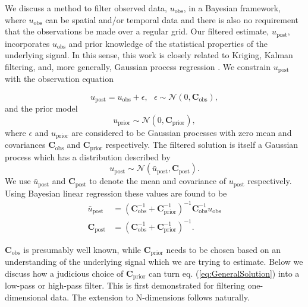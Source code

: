 \documentclass[10pt,a4paper]{article}
\begin{document}
We discuss a method to filter observed data, $u_\mathrm{obs}$, in a Bayesian framework, where $u_\mathrm{obs}$ can be spatial and/or temporal data and there is also no requirement that the observations be made over a regular grid. Our filtered estimate, $u_\mathrm{post}$, incorporates $u_\mathrm{obs}$ and prior knowledge of the statistical properties of the underlying signal.  In this sense, this work is closely related to Kriging, Kalman filtering, and, more generally, Gaussian process regression \citep[e.g][]{Rasmussen2006} .  We constrain $u_\mathrm{post}$ with the observation equation

\begin{equation}\label{eq:Data}
  u_\mathrm{post} = u_\mathrm{obs} + \epsilon,\ \ \ \epsilon \sim \mathcal{N}(0,\mathbf{C}_\mathrm{obs}),
\end{equation}
and the prior model
\begin{equation}\label{eq:Prior}
  u_\mathrm{prior} \sim \mathcal{N}(0,\mathbf{C}_\mathrm{prior}),
\end{equation}
where $\epsilon$ and $u_\mathrm{prior}$ are considered to be Gaussian processes with zero mean and covariances $\mathbf{C}_\mathrm{obs}$ and $\mathbf{C}_\mathrm{prior}$ respectively.  The filtered solution is itself a Gaussian process which has a distribution described by
\begin{equation}
  u_\mathrm{post} \sim \mathcal{N}(\bar{u}_\mathrm{post},\mathbf{C}_\mathrm{post}).
\end{equation}
We use $\bar{u}_\mathrm{post}$ and $\mathbf{C}_\mathrm{post}$ to denote the mean and covariance of $u_\mathrm{post}$ respectively.  Using Bayesian linear regression \citep[e.g.][]{Tarantola2005} these values are found to be  
\begin{equation}\label{eq:GeneralSolution}
\begin{split}
  \bar{u}_\mathrm{post} &= (\mathbf{C}_\mathrm{obs}^{-1} + 
                            \mathbf{C}_\mathrm{prior}^{-1})^{-1}
                            \mathbf{C}_\mathrm{obs}^{-1} u_\mathrm{obs}
\\
\mathbf{C}_\mathrm{post} &= (\mathbf{C}_\mathrm{obs}^{-1} + 
                             \mathbf{C}_\mathrm{prior}^{-1})^{-1}.                          
\end{split}
\end{equation}
 
$\mathbf{C}_\mathrm{obs}$ is presumably well known, while $\mathbf{C}_\mathrm{prior}$ needs to be chosen based on an understanding of the underlying signal which we are trying to estimate.  Below we discuss how a judicious choice of $\mathbf{C}_\mathrm{prior}$ can turn eq. (\ref{eq:GeneralSolution}) into a low-pass or high-pass filter.  This is first demonstrated for filtering one-dimensional data.  The extension to N-dimensions follows naturally.  
\end{document}

